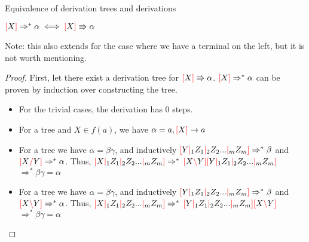 \documentclass[main.tex]{subfiles}
\begin{document}
\begin{prop}
    Equivalence of derivation trees and derivations

    $ \lb X \rb \Rightarrow^* \alpha \iff \lb X \rb \Rrightarrow \alpha $

    Note: this also extends for the case where we have a terminal on the left,
    but it is not worth mentioning.
\end{prop}
\begin{proof}
    First, let there exist a derivation tree for $ \lb X \rb \Rrightarrow \alpha $.
    $\lb X \rb \Rightarrow^* \alpha$ can be proven by induction over constructing
    the tree.
    \begin{itemize}
        \item For the trivial cases, the derivation has 0 steps.
        \item For a tree
            and $X \in f(a)$, we have $\alpha = a, \lb X \rb \rightarrow a$
        \item For a tree
            we have $\alpha = \beta \gamma$, and inductively
            $\lb Y \mc_1 Z_1 \mc_2 Z_2 ... \mc_m Z_m \rb \Rightarrow^* \beta$ and
            $\lb X \rc Y \rb \Rightarrow^* \alpha$. Thus,
            $\lb X \mc_1 Z_1 \mc_2 Z_2 ... \mc_m Z_m \rb \Rightarrow^*$
            $\lb X \lc Y \rb \lb Y \mc_1 Z_1 \mc_2 Z_2 ... \mc_m Z_m \rb$
            $ \Rightarrow^* \beta \gamma = \alpha$
        \item For a tree
            we have $\alpha = \beta \gamma$, and inductively
            $\lb Y \mc_1 Z_1 \mc_2 Z_2 ... \mc_m Z_m \rb \Rightarrow^* \beta$ and
            $\lb X \lc Y \rb \Rightarrow^* \alpha$. Thus,
            $\lb X \mc_1 Z_1 \mc_2 Z_2 ... \mc_m Z_m \rb \Rightarrow^*$
            $\lb Y \mc_1 Z_1 \mc_2 Z_2 ... \mc_m Z_m \rb \lb X \lc Y \rb$
            $ \Rightarrow^* \beta \gamma = \alpha$
    \end{itemize}


\end{proof}
\end{document}

